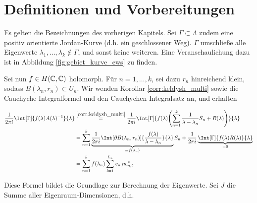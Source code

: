 \section{Definitionen und Vorbereitungen}

Es gelten die Bezeichnungen des vorherigen Kapitels.
Sei $\Gamma \subset \Lambda$ zudem eine positiv orientierte Jordan-Kurve (d.h. ein geschlossener Weg).
$\Gamma$ umschließe alle Eigenwerte $\lambda_1, \dots, \lambda_k \not \in \Gamma$, und sonst keine weiteren.
Eine Veranschaulichung dazu ist in Abbildung \ref{fig:gebiet_kurve_ews} zu finden.



Sei nun $f \in H(\mathbb{C}, \mathbb{C})$ holomorph.
Für $n = 1, \dots, k$, sei dazu $r_n$ hinreichend klein, sodass $B(\lambda_n, r_n) \subset U_n$.
Wir wenden Korollar \ref{corr:keldysh_multi} sowie die Cauchyche Integralformel und den Cauchychen Integralsatz an, und erhalten

\begin{align} \label{eq:cauchysche_integral_formel_satz}
    \begin{split}
        \frac{1}{2 \pi i}
        \Int[\Gamma]
        {
            f(\lambda) A(\lambda)^{-1}
        }{\lambda}
        & \stackrel
        {
            \ref{corr:keldysh_multi}
        }{=}
        \frac{1}{2 \pi i}
        \Int[\Gamma]
        {
            f(\lambda)
            \pbraces
            {
                \sum_{n=1}^k
                    \frac{1}{\lambda - \lambda_n} S_n
                    +
                    R(\lambda)
            }
        }{\lambda} \\
        & =
        \sum_{n=1}^k
            \underbrace
            {
                \frac{1}{2 \pi i}
                \Int[\partial B(\lambda_n, r_n)]
                {
                    \frac{f(\lambda)}{\lambda - \lambda_n}
                }{\lambda}
            }_{=f(\lambda_n)}
            S_n
        +
        \frac{1}{2 \pi i}
        \underbrace
        {
            \Int[\Gamma]
            {
                f(\lambda) R(\lambda)
            }{\lambda}
        }_{=0} \\
        & =
        \sum_{n=1}^k
            f(\lambda_n)
            \sum_{l=1}^{L_n}
                v_{n, l} w_{n, l}^\ast.
    \end{split}
\end{align}

Diese Formel bildet die Grundlage zur Berechnung der Eigenwerte.
Sei $J$ die Summe aller Eigenraum-Dimensionen, d.h.

